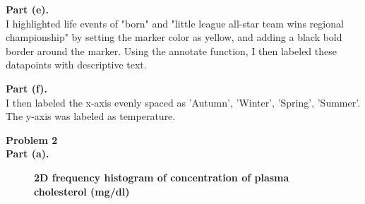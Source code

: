 \documentclass[letterpaper,12pt]{article}
\theoremstyle{definition}
\begin{document}
\textbf{Part (e).} \\
\flushleft I highlighted life events of "born" and "little league all-star team wins regional championship" by setting the marker color as yellow, and adding a black bold border around the marker. Using the annotate function, I then labeled these datapoints with descriptive text. 
\flushleft

\textbf{Part (f).} \\
\flushleft I then labeled the x-axis evenly spaced as 'Autumn', 'Winter', 'Spring', 'Summer'. The y-axis was labeled as temperature. 
\flushleft

\newpage
\noindent\textbf{Problem 2}\\
\textbf{Part (a).} \\
\begin{figure}[htb]\centering\captionsetup{width=4.0in}
  \caption{\textbf{2D frequency histogram of concentration of plasma cholesterol (mg/dl)}}\label{FigExample}
\end{figure}
\end{document}
